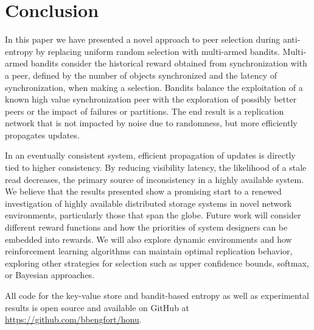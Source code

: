 \section*{Conclusion}

In this paper we have presented a novel approach to peer selection during
anti-entropy by replacing uniform random selection with multi-armed bandits.
Multi-armed bandits consider the historical reward obtained from
synchronization with a peer, defined by the number of objects synchronized
and the latency of synchronization, when making a selection.
Bandits balance the exploitation of a known high value synchronization
peer with the exploration of possibly better peers or the impact of
failures or partitions.
The end result is a replication network that is not impacted by noise
due to randomness, but more efficiently propagates updates.

In an eventually consistent system, efficient propagation of updates is
directly tied to higher consistency.
By reducing visibility latency, the likelihood of a stale read decreases,
the primary source of inconsistency in a highly available system.
We believe that the results presented show a promising start to a renewed
investigation of highly available distributed storage systems in novel
network environments, particularly those that span the globe.
Future work will consider different reward functions and how the priorities
of system designers can be embedded into rewards.
We will also explore dynamic environments and how reinforcement learning
algorithms can maintain optimal replication behavior, exploring other
strategies for selection such as upper confidence bounds, softmax, or
Bayesian approaches.

All code for the key-value store and bandit-based entropy as well as
experimental results is open source and available on GitHub at
\url{https://github.com/bbengfort/honu}.
